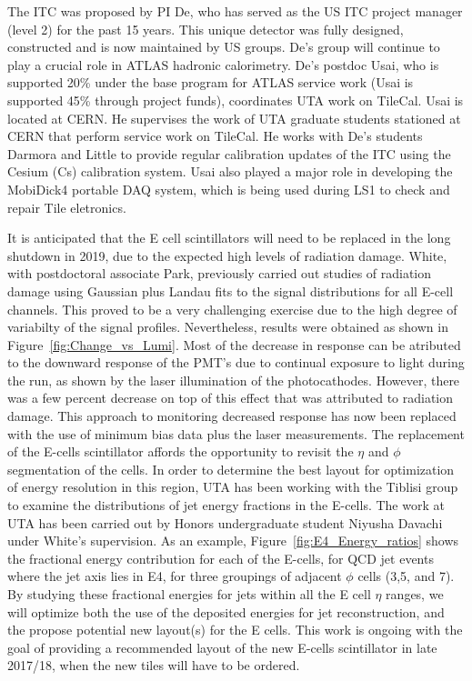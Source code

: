 The ITC was proposed by PI De, who has served as the US ITC project manager (level 2) for the past 15 years. This unique detector was fully designed, constructed and is now maintained by US groups. 
De's group will continue to play a crucial role in ATLAS hadronic calorimetry. De's postdoc Usai, who is supported 20\% under the base program for ATLAS service work (Usai is supported 45\% through project funds), coordinates UTA  work on TileCal. Usai is located at CERN. He supervises the work of UTA graduate students stationed at CERN that perform service work on TileCal. He works with De's students Darmora and Little to provide regular calibration updates of the ITC using the Cesium (Cs) calibration system. Usai also played a major role in developing the MobiDick4 portable DAQ system, which is being used during LS1 to check and repair Tile eletronics.

It is anticipated that the E cell scintillators will need to be replaced in the long 
shutdown in 2019, due to the expected high levels of radiation damage. White, with postdoctoral
associate Park, previously carried out studies of radiation damage using Gaussian plus
Landau fits to the signal distributions for all E-cell channels. This proved to be a very
challenging exercise due to the high degree of variabilty of the signal profiles.
Nevertheless, results were obtained as shown in Figure~\ref{fig:Change_vs_Lumi}. Most of the
decrease in response can be atributed to the downward response of the PMT's due to continual 
exposure to light during the run, as shown by the laser illumination of the photocathodes. 
However, there was a few percent decrease on top of this effect that was attributed to radiation 
damage. This approach to monitoring decreased response has now been replaced with the use of 
minimum bias data plus the laser measurements.
The replacement of the E-cells scintillator affords the opportunity to revisit the $\eta$ and $\phi$ 
segmentation of the cells. In order to determine the best layout for optimization of energy 
resolution in this region, UTA has been working with the Tiblisi group to examine the distributions
of jet energy fractions in the E-cells. The work at UTA has been carried out by Honors
undergraduate student Niyusha Davachi under White's supervision. As an example, Figure~\ref{fig:E4_Energy_ratios} 
shows the fractional energy contribution for each of the E-cells, for QCD jet events where the jet axis lies in E4,
for three groupings of adjacent $\phi$ cells (3,5, and 7). By studying these fractional energies for jets within all 
the E cell $\eta$ ranges, we will optimize both the use of the deposited energies for jet reconstruction, 
and the propose potential new layout(s) for the E cells. This work is ongoing with the
goal of providing a recommended layout of the new E-cells scintillator in late 2017/18, when the new tiles will 
have to be ordered. 

